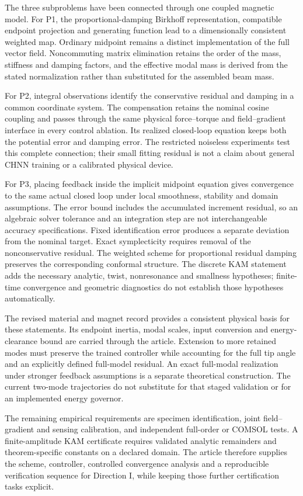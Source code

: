 The three subproblems have been connected through one coupled magnetic model. For P1, the proportional-damping Birkhoff representation, compatible endpoint projection and generating function lead to a dimensionally consistent weighted map. Ordinary midpoint remains a distinct implementation of the full vector field. Noncommuting matrix elimination retains the order of the mass, stiffness and damping factors, and the effective modal mass is derived from the stated normalization rather than substituted for the assembled beam mass.

For P2, integral observations identify the conservative residual and damping in a common coordinate system. The compensation retains the nominal cosine coupling and passes through the same physical force--torque and field--gradient interface in every control ablation. Its realized closed-loop equation keeps both the potential error and damping error. The restricted noiseless experiments test this complete connection; their small fitting residual is not a claim about general CHNN training or a calibrated physical device.

For P3, placing feedback inside the implicit midpoint equation gives convergence to the same actual closed loop under local smoothness, stability and domain assumptions. The error bound includes the accumulated increment residual, so an algebraic solver tolerance and an integration step are not interchangeable accuracy specifications. Fixed identification error produces a separate deviation from the nominal target. Exact symplecticity requires removal of the nonconservative residual. The weighted scheme for proportional residual damping preserves the corresponding conformal structure. The discrete KAM statement adds the necessary analytic, twist, nonresonance and smallness hypotheses; finite-time convergence and geometric diagnostics do not establish those hypotheses automatically.

The revised material and magnet record provides a consistent physical basis for these statements. Its endpoint inertia, modal scales, input conversion and energy-clearance bound are carried through the article. Extension to more retained modes must preserve the trained controller while accounting for the full tip angle and an explicitly defined full-model residual. An exact full-modal realization under stronger feedback assumptions is a separate theoretical construction. The current two-mode trajectories do not substitute for that staged validation or for an implemented energy governor.

The remaining empirical requirements are specimen identification, joint field--gradient and sensing calibration, and independent full-order or COMSOL tests. A finite-amplitude KAM certificate requires validated analytic remainders and theorem-specific constants on a declared domain. The article therefore supplies the scheme, controller, controlled convergence analysis and a reproducible verification sequence for Direction I, while keeping those further certification tasks explicit.

